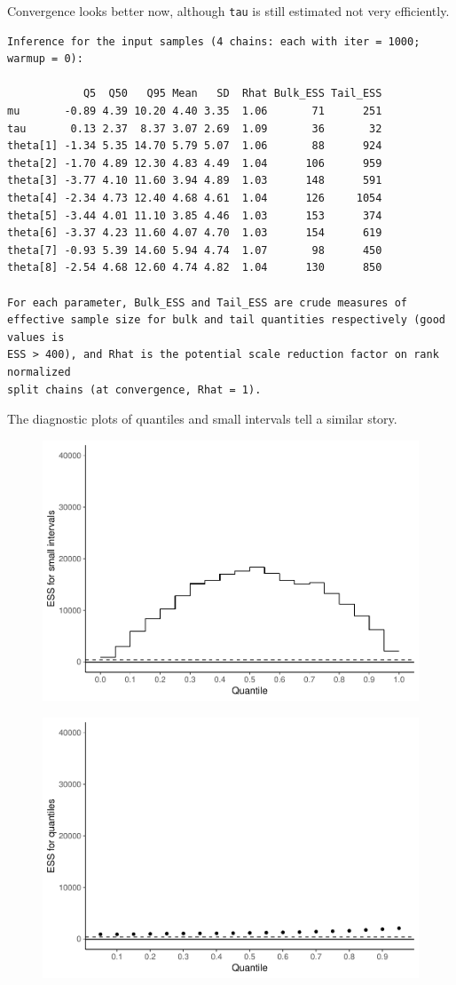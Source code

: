 \documentclass[american,]{article}
\begin{document}
Convergence looks better now, although \texttt{tau} is still estimated
not very efficiently.

\begin{verbatim}
Inference for the input samples (4 chains: each with iter = 1000; warmup = 0):

            Q5  Q50   Q95 Mean   SD  Rhat Bulk_ESS Tail_ESS
mu       -0.89 4.39 10.20 4.40 3.35  1.06       71      251
tau       0.13 2.37  8.37 3.07 2.69  1.09       36       32
theta[1] -1.34 5.35 14.70 5.79 5.07  1.06       88      924
theta[2] -1.70 4.89 12.30 4.83 4.49  1.04      106      959
theta[3] -3.77 4.10 11.60 3.94 4.89  1.03      148      591
theta[4] -2.34 4.73 12.40 4.68 4.61  1.04      126     1054
theta[5] -3.44 4.01 11.10 3.85 4.46  1.03      153      374
theta[6] -3.37 4.23 11.60 4.07 4.70  1.03      154      619
theta[7] -0.93 5.39 14.60 5.94 4.74  1.07       98      450
theta[8] -2.54 4.68 12.60 4.74 4.82  1.04      130      850

For each parameter, Bulk_ESS and Tail_ESS are crude measures of 
effective sample size for bulk and tail quantities respectively (good values is 
ESS > 400), and Rhat is the potential scale reduction factor on rank normalized
split chains (at convergence, Rhat = 1).
\end{verbatim}

The diagnostic plots of quantiles and small intervals tell a similar
story.

\begin{figure}[t]
  \centering
  \includegraphics[width=0.6\linewidth]{graphics/local-ess-jags-cp-tau-longer-1.pdf}
\end{figure}

\begin{figure}[t]
  \centering
  \includegraphics[width=0.6\linewidth]{graphics/quantile-ess-jags-cp-tau-longer-1.pdf}
\end{figure}
\end{document}

